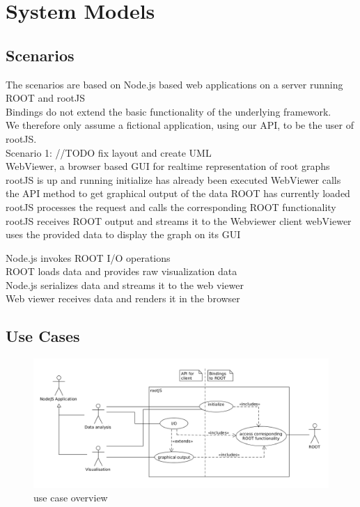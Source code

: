 \chapter{System Models}

\section{Scenarios}
The scenarios are based on Node.js based web applications on a server running ROOT and rootJS\\
Bindings do not extend the basic functionality of the underlying framework.\\
We therefore only assume a fictional application, using our API, to be the user of rootJS.\\


Scenario 1: //TODO fix layout and create UML\\
WebViewer, a browser based GUI for realtime representation of root graphs
	rootJS is up and running initialize has already been executed
	WebViewer calls the API method to get graphical output of the data ROOT has currently loaded
	\indent rootJS processes the request and calls the corresponding ROOT functionality
	\indent rootJS receives ROOT output and streams it to the Webviewer client
webViewer uses the provided data to display the graph on its GUI

\indent	Node.js invokes ROOT I/O operations\\
\indent \indent		ROOT loads data and provides raw visualization data\\
\indent	Node.js serializes data and streams it to the web viewer\\
Web viewer receives data and renders it in the browser\\

\section{Use Cases}
\begin{figure}[htb]
	\centering
	\includegraphics[width=18cm]{./latex/resources/usecaseOverview.png}
	\caption{use case overview}
\end{figure}


